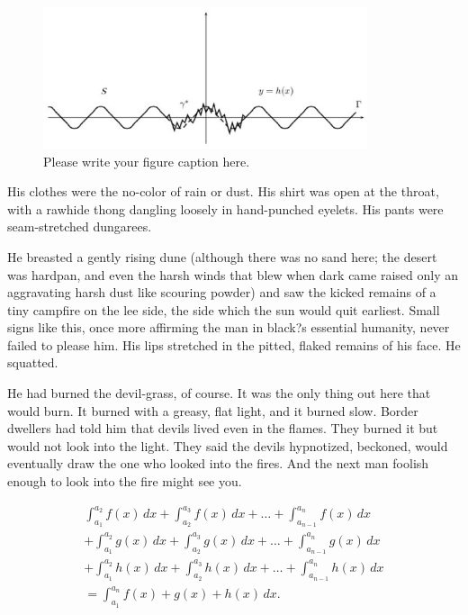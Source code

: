 \documentclass[
11pt,%
tightenlines,%
twoside,%
onecolumn,%
nofloats,%
nobibnotes,%
nofootinbib,%
superscriptaddress,%
noshowpacs,%
centertags]%
{revtex4}
\begin{document}
\begin{figure}[h]
\setcaptionmargin{5mm}
\onelinecaptionstrue  %
\includegraphics[width=0.85\textwidth]{deform.eps}
\caption{Please write your figure caption here.}\label{fig:1}
\end{figure}

His clothes were the no-color of rain or dust. His shirt was open at the throat, with a rawhide thong dangling loosely in hand-punched eyelets. His pants were seam-stretched dungarees.

He breasted a gently rising dune (although there was no sand here; the desert was hardpan, and even the harsh winds that blew when dark came raised only an aggravating harsh dust like scouring powder) and saw the kicked remains of a tiny campfire on the lee side, the side which the sun would quit earliest. Small signs like this, once more affirming the man in black?s essential humanity, never failed to please him. His lips stretched in the pitted, flaked remains of his face. He squatted.

He had burned the devil-grass, of course. It was the only thing out here that would burn. It burned with a greasy, flat light, and it burned slow. Border dwellers had told him that devils lived even in the flames. They burned it but would not look into the light. They said the devils hypnotized, beckoned, would eventually draw the one who looked into the fires. And the next man foolish enough to look into the fire might see you.

\begin{multline}
\int_{a_1}^{a_2} f(x)\,dx+\int_{a_2}^{a_3} f(x)\,dx
+\dots+\int_{a_{n-1}}^{a_n} f(x)\,dx\\
+\int_{a_1}^{a_2} g(x)\,dx+\int_{a_2}^{a_3} g(x)\,dx
+\dots+\int_{a_{n-1}}^{a_n} g(x)\,dx\\
+\int_{a_1}^{a_2} h(x)\,dx+\int_{a_2}^{a_3} h(x)\,dx
+\dots+\int_{a_{n-1}}^{a_n} h(x)\,dx\\
=\int_{a_1}^{a_n} f(x)+g(x)+h(x)\,dx.
\end{multline}
\end{document}
